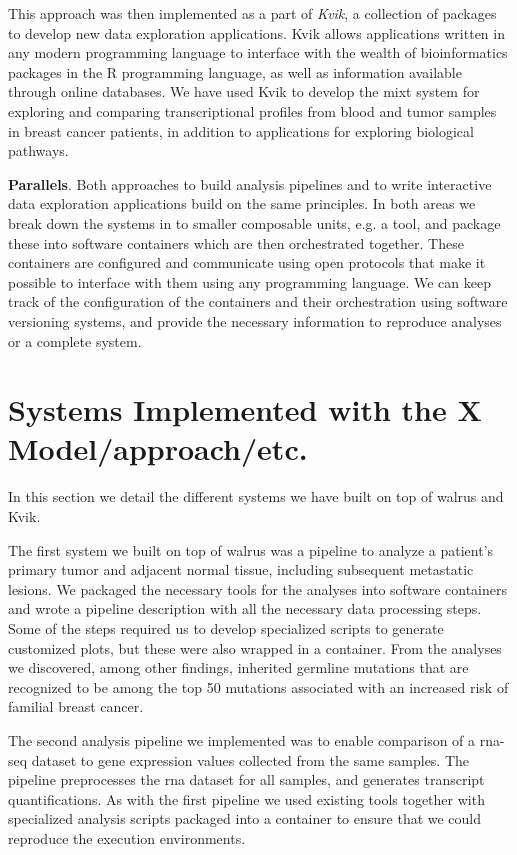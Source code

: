 This approach was then implemented as a part of \emph{Kvik}, a collection of
packages to develop new data exploration applications. Kvik allows
applications written in any modern programming language to interface with the
wealth of bioinformatics packages in the R programming language, as well as
information available through online databases. We have used Kvik to develop the
\gls{mixt} system for exploring and comparing transcriptional profiles from
blood and tumor samples in breast cancer patients, in addition to applications
for exploring biological pathways. 

\textbf{Parallels}. 
Both approaches to build analysis pipelines and to write interactive data
exploration applications build on the same principles. In both areas we break
down the systems in to smaller composable units, e.g. a tool, and package these
into software containers which are then orchestrated together. These containers
are configured and communicate using open protocols that make it possible to
interface with them using any programming language. We can keep track of the
configuration of the containers and their orchestration using software
versioning systems, and provide the necessary information to reproduce analyses
or a complete system. 


\section{Systems Implemented with the X Model/approach/etc.} 
In this section we detail the different systems we have built on top of walrus
and Kvik. 

The first system we built on top of walrus was a pipeline to analyze a patient’s
primary tumor and adjacent normal tissue, including subsequent metastatic
lesions.\cite{walrus} We packaged the necessary tools for the analyses into
software containers and wrote a pipeline description with all the necessary data
processing steps. Some of the steps required us to develop specialized scripts
to generate customized plots, but these were also wrapped in a container. From
the analyses we discovered, among other findings, inherited germline mutations
that are recognized to be among the top 50 mutations associated with an
increased risk of familial breast cancer.

The second analysis pipeline we implemented was to enable comparison of a
\gls{rna}-seq dataset to 
gene expression values collected from the same samples.
The pipeline preprocesses the \gls{rna} dataset for all samples, and generates
transcript quantifications. As with the first pipeline we used existing tools
together with specialized analysis scripts packaged into a container to ensure
that we could reproduce the execution environments. 

